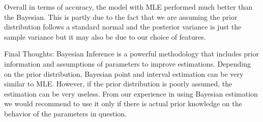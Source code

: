 \documentclass{article}
\begin{document}
Overall in terms of accuracy, the model with MLE performed much better than the Bayesian. This is partly due to the fact that we are assuming the prior distribution follows a standard normal and the posterior variance is just the sample variance but it may also be due to our choice of features. \newline

Final Thoughts:
Bayesian Inference is a powerful methodology that includes prior information and assumptions of parameters to improve estimations. Depending on the prior distribution, Bayesian point and interval estimation can be very similar to MLE. However, if the prior distribution is poorly assumed, the estimation can be very useless. From our experience in using Bayesian estimation we would recommend to use it only if there is actual prior knowledge on the behavior of the parameters in question.\newline
\end{document}
